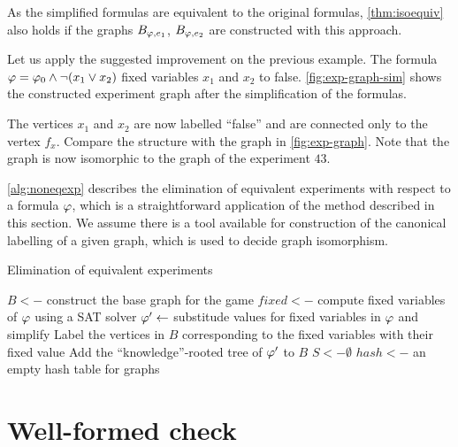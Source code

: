 As the simplified formulas are equivalent to the original formulas,
\autoref{thm:isoequiv} also holds if the graphs $B_{\varphi, e_1}$, $B_{\varphi, e_2}$
are constructed with this approach.

\begin{example}
Let us apply the suggested improvement on the previous example.
The formula $\varphi = \varphi_0\wedge\neg(x_1\vee x_2)$ fixed variables
$x_1$ and $x_2$ to false.
\autoref{fig:exp-graph-sim} shows the constructed experiment graph
  after the simplification of the formulas.

The vertices $x_1$ and $x_2$ are now labelled ``false'' and are connected
  only to the vertex $f_x$.
Compare the structure with the graph in \autoref{fig:exp-graph}.
Note that the graph is now isomorphic to the graph of the experiment $43$.\eqed
\end{example}

\autoref{alg:noneqexp} describes the elimination of equivalent experiments with respect to a formula $\varphi$,
  which is a straightforward application of the method described in this section.
We assume there is a tool available for construction of the canonical labelling
  of a given graph,
  which is used to decide graph isomorphism.

\begin{algorithm}[!ht]
\caption{Elimination of equivalent experiments}
\label{alg:noneqexp}
\DontPrintSemicolon
$B <-$ construct the base graph for the game\;
$fixed <-$ compute fixed variables of $\varphi$ using a SAT solver\;
$\varphi' <- $ substitude values for fixed variables in $\varphi$ and simplify\;
Label the vertices in $B$ corresponding to the fixed variables with their fixed value\;
Add the ``knowledge''-rooted tree of $\varphi'$ to $B$\;
$S <- \emptyset$\;
$hash <- $ an empty hash table for graphs\;
\end{algorithm}

\pagebreak
\section{Well-formed check}

